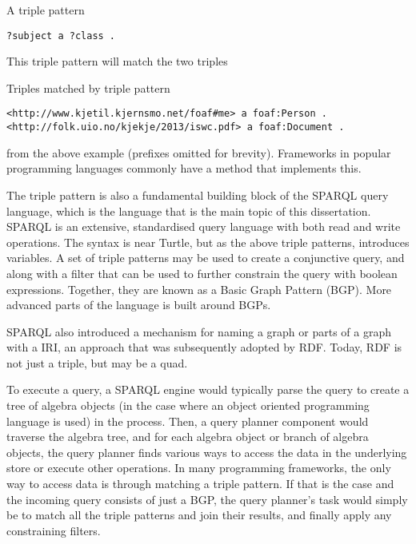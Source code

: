 \begin{example}{A triple pattern}
\begin{verbatim}
?subject a ?class .
\end{verbatim}
\end{example}
This triple pattern will match the two triples 
\begin{example}{Triples matched by triple pattern}
\begin{verbatim}
<http://www.kjetil.kjernsmo.net/foaf#me> a foaf:Person .
<http://folk.uio.no/kjekje/2013/iswc.pdf> a foaf:Document .
\end{verbatim}
from the above example (prefixes omitted for brevity). Frameworks in
popular programming languages commonly have a method that implements
this.

The triple pattern is also a fundamental building block of the SPARQL
query language, which is the language that is the main topic of this
dissertation. SPARQL is an extensive, standardised query language with
both read and write operations. The syntax is near Turtle, but as the
above triple patterns, introduces variables. A set of triple patterns
may be used to create a conjunctive query, and along with a filter
that can be used to further constrain the query with boolean
expressions. Together, they are known as a Basic Graph Pattern
(BGP). More advanced parts of the language is built around BGPs.

SPARQL also introduced a mechanism for naming a graph or parts of a
graph with a IRI, an approach that was subsequently adopted by
RDF. Today, RDF is not just a triple, but may be a quad.

To execute a query, a SPARQL engine would typically parse the query to
create a tree of algebra objects (in the case where an object oriented
programming language is used) in the process. Then, a query planner
component would traverse the algebra tree, and for each algebra object
or branch of algebra objects, the query planner finds various ways to
access the data in the underlying store or execute other
operations. In many programming frameworks, the only way to access
data is through matching a triple pattern. If that is the case and
the incoming query consists of just a BGP, the query planner's task
would simply be to match all the triple patterns and join their
results, and finally apply any constraining filters. 


\end{example}

